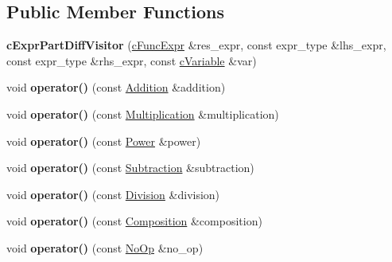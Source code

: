 \subsection*{Public Member Functions}
\begin{DoxyCompactItemize}
\item 
\hypertarget{classcExprPartDiffVisitor_a82f311613805af08caffb341f5de5da5}{{\bfseries c\-Expr\-Part\-Diff\-Visitor} (\hyperlink{classcFuncExpr}{c\-Func\-Expr} \&res\-\_\-expr, const expr\-\_\-type \&lhs\-\_\-expr, const expr\-\_\-type \&rhs\-\_\-expr, const \hyperlink{classcVariable}{c\-Variable} \&var)}\label{classcExprPartDiffVisitor_a82f311613805af08caffb341f5de5da5}

\item 
\hypertarget{classcExprPartDiffVisitor_a525ee88a44c89f654699eb441e59feeb}{void {\bfseries operator()} (const \hyperlink{classAddition}{Addition} \&addition)}\label{classcExprPartDiffVisitor_a525ee88a44c89f654699eb441e59feeb}

\item 
\hypertarget{classcExprPartDiffVisitor_a3c0996fff51e7e659426fc24dec81a6e}{void {\bfseries operator()} (const \hyperlink{classMultiplication}{Multiplication} \&multiplication)}\label{classcExprPartDiffVisitor_a3c0996fff51e7e659426fc24dec81a6e}

\item 
\hypertarget{classcExprPartDiffVisitor_ae954a7f120413163604f321df05feadc}{void {\bfseries operator()} (const \hyperlink{classPower}{Power} \&power)}\label{classcExprPartDiffVisitor_ae954a7f120413163604f321df05feadc}

\item 
\hypertarget{classcExprPartDiffVisitor_a594c187f539a3a836f87fcdfd6f8afb0}{void {\bfseries operator()} (const \hyperlink{classSubtraction}{Subtraction} \&subtraction)}\label{classcExprPartDiffVisitor_a594c187f539a3a836f87fcdfd6f8afb0}

\item 
\hypertarget{classcExprPartDiffVisitor_a07ea76d4a559931b1bbfa22e8eb120b9}{void {\bfseries operator()} (const \hyperlink{classDivision}{Division} \&division)}\label{classcExprPartDiffVisitor_a07ea76d4a559931b1bbfa22e8eb120b9}

\item 
\hypertarget{classcExprPartDiffVisitor_a2ecc44350aa1fd3406e7c39c0cc779d5}{void {\bfseries operator()} (const \hyperlink{classComposition}{Composition} \&composition)}\label{classcExprPartDiffVisitor_a2ecc44350aa1fd3406e7c39c0cc779d5}

\item 
\hypertarget{classcExprPartDiffVisitor_ad63cf3bda73c5e71752ba72b677298fd}{void {\bfseries operator()} (const \hyperlink{structNoOp}{No\-Op} \&no\-\_\-op)}\label{classcExprPartDiffVisitor_ad63cf3bda73c5e71752ba72b677298fd}

\end{DoxyCompactItemize}
